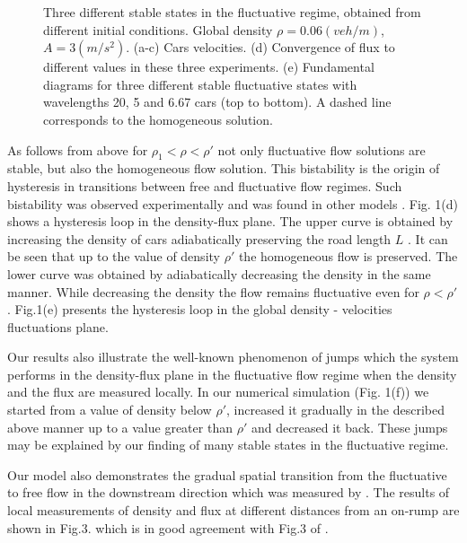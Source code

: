 \begin{figure*}
\label{2}

\centerline{  }
\vskip0.3cm
\caption{ Three different stable states in the fluctuative regime, obtained from different initial conditions. Global density $\rho=0.06(veh/m)$, $A=3(m/s^2)$. (a-c) Cars velocities. (d) Convergence of flux to different values in these three experiments. (e) Fundamental diagrams for three different stable fluctuative states with wavelengths 20, 5 and 6.67 cars (top to bottom). A dashed line corresponds to the homogeneous solution.}

\end{figure*}

As follows from above for
$\rho_1<\rho<\rho'$ not only fluctuative flow solutions are stable, but also
the homogeneous flow solution. This bistability is the origin of
hysteresis in transitions between free and fluctuative flow regimes.
Such bistability was observed experimentally \cite{KR1} and was found in
other models \cite{Sug,PN,LLK}. Fig. 1(d) shows a hysteresis
loop in the density-flux plane. The upper curve is obtained by
increasing the density of cars adiabatically preserving the road
length $L$ \cite{insert}. It can be seen that up to the value of density
$\rho'$ the homogeneous flow is preserved. The lower
curve was obtained by adiabatically decreasing the density in the same manner.
While decreasing the density the flow remains fluctuative even for
$\rho<\rho'$. Fig.1(e) presents the hysteresis loop in the global density -
velocities fluctuations plane.

Our results also illustrate the well-known phenomenon
\cite{KR1,KR2,Sug,LLK,Nagel} of jumps which the system performs in the
density-flux plane in the fluctuative flow regime when the density and the
flux are measured locally. In our numerical simulation (Fig. 1(f)) we started
from a value of density below $\rho'$, increased it gradually in the described
above manner up to a value greater than $\rho'$ and decreased it back.
These jumps may be explained by our finding of many stable states in the
fluctuative regime.

Our model also demonstrates the gradual spatial transition from the fluctuative
to free flow in the downstream direction which was measured by \cite{KR1}.
The results of local measurements of density and flux at different distances
from an on-rump \cite{onrump} are shown in Fig.3. which is in good agreement
with Fig.3 of \cite{KR1}.

